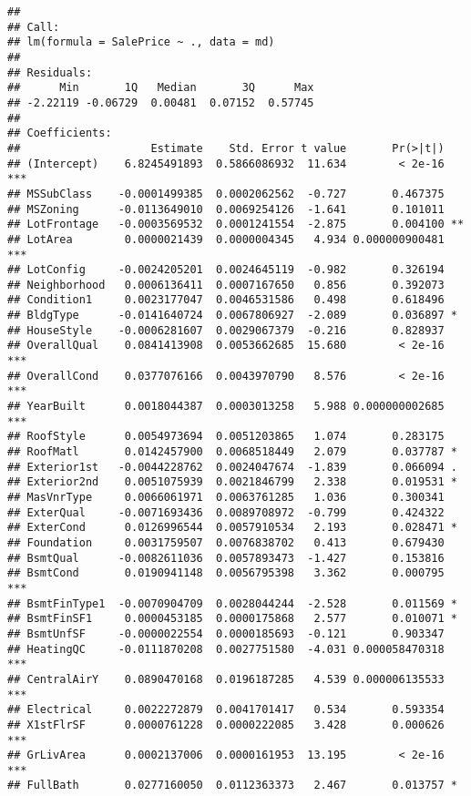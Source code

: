 \documentclass[]{article}
\begin{document}
\begin{verbatim}
## 
## Call:
## lm(formula = SalePrice ~ ., data = md)
## 
## Residuals:
##      Min       1Q   Median       3Q      Max 
## -2.22119 -0.06729  0.00481  0.07152  0.57745 
## 
## Coefficients:
##                    Estimate    Std. Error t value       Pr(>|t|)    
## (Intercept)    6.8245491893  0.5866086932  11.634        < 2e-16 ***
## MSSubClass    -0.0001499385  0.0002062562  -0.727       0.467375    
## MSZoning      -0.0113649010  0.0069254126  -1.641       0.101011    
## LotFrontage   -0.0003569532  0.0001241554  -2.875       0.004100 ** 
## LotArea        0.0000021439  0.0000004345   4.934 0.000000900481 ***
## LotConfig     -0.0024205201  0.0024645119  -0.982       0.326194    
## Neighborhood   0.0006136411  0.0007167650   0.856       0.392073    
## Condition1     0.0023177047  0.0046531586   0.498       0.618496    
## BldgType      -0.0141640724  0.0067806927  -2.089       0.036897 *  
## HouseStyle    -0.0006281607  0.0029067379  -0.216       0.828937    
## OverallQual    0.0841413908  0.0053662685  15.680        < 2e-16 ***
## OverallCond    0.0377076166  0.0043970790   8.576        < 2e-16 ***
## YearBuilt      0.0018044387  0.0003013258   5.988 0.000000002685 ***
## RoofStyle      0.0054973694  0.0051203865   1.074       0.283175    
## RoofMatl       0.0142457900  0.0068518449   2.079       0.037787 *  
## Exterior1st   -0.0044228762  0.0024047674  -1.839       0.066094 .  
## Exterior2nd    0.0051075939  0.0021846799   2.338       0.019531 *  
## MasVnrType     0.0066061971  0.0063761285   1.036       0.300341    
## ExterQual     -0.0071693436  0.0089708972  -0.799       0.424322    
## ExterCond      0.0126996544  0.0057910534   2.193       0.028471 *  
## Foundation     0.0031759507  0.0076838702   0.413       0.679430    
## BsmtQual      -0.0082611036  0.0057893473  -1.427       0.153816    
## BsmtCond       0.0190941148  0.0056795398   3.362       0.000795 ***
## BsmtFinType1  -0.0070904709  0.0028044244  -2.528       0.011569 *  
## BsmtFinSF1     0.0000453185  0.0000175868   2.577       0.010071 *  
## BsmtUnfSF     -0.0000022554  0.0000185693  -0.121       0.903347    
## HeatingQC     -0.0111870208  0.0027751580  -4.031 0.000058470318 ***
## CentralAirY    0.0890470168  0.0196187285   4.539 0.000006135533 ***
## Electrical     0.0022272879  0.0041701417   0.534       0.593354    
## X1stFlrSF      0.0000761228  0.0000222085   3.428       0.000626 ***
## GrLivArea      0.0002137006  0.0000161953  13.195        < 2e-16 ***
## FullBath       0.0277160050  0.0112363373   2.467       0.013757 *  

\end{verbatim}
\end{document}
